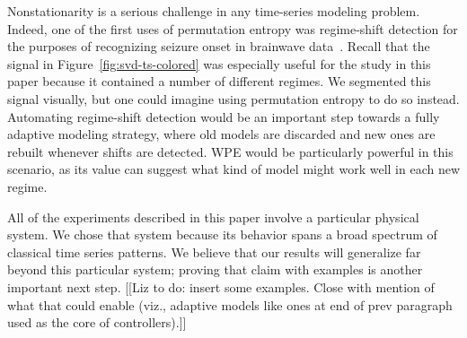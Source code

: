 Nonstationarity is a serious challenge in any time-series modeling
problem.  Indeed, one of the first uses of permutation entropy was
regime-shift detection for the purposes of recognizing seizure onset
in brainwave data~\cite{cao2004det}.  Recall that the signal in
Figure~\ref{fig:svd-ts-colored} was especially useful for the study in
this paper because it contained a number of different regimes.  We
segmented this signal visually, but one could imagine using
permutation entropy to do so instead.  Automating regime-shift
detection would be an important step towards a fully adaptive modeling
strategy, where old models are discarded and new ones are rebuilt
whenever shifts are detected.  WPE would be particularly powerful in
this scenario, as its value can suggest what kind of model might work
well in each new regime.

All of the experiments described in this paper involve a particular
physical system.  We chose that system because its behavior spans a
broad spectrum of classical time series patterns.  We believe that our
results will generalize far beyond this particular system; proving
that claim with examples is another important next step.  [[Liz to do:
    insert some examples.  Close with mention of what that could
    enable (viz., adaptive models like ones at end of prev paragraph
    used as the core of controllers).]]

